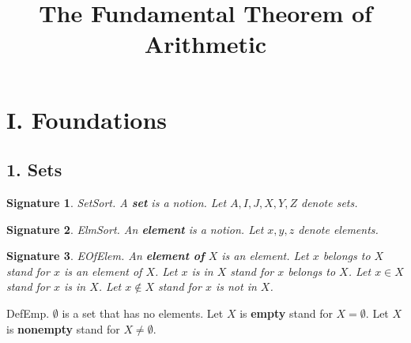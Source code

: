 \newtheorem{signature}{Signature}
\newtheorem{axiom}{Axiom}
\newtheorem{signaturep}{Signature}
\newtheorem{axiomp}{Axiom}
\newtheorem{definitionp}{Definition}
\newtheorem{theoremp}{Theorem}
\newtheorem{lemmap}{Lemma}
 
\newcommand{\power}{{\cal P}} 
\newcommand{\preimg}[2]{{#1}^{-1}[#2]} 
\newcommand{\Seq}[2]{\{#1,\dots,#2\}}
\newcommand{\Set}[3]{\{#1_{#2},\dots,#1_{#3}\}}
\newcommand{\Pro}[2]{\prod_{i\in #2}{#1}_i}
\newcommand{\Product}[3]{\prod_{i=#2}^{#3}{#1}_i}
\newcommand{\subfunc}[2]{{#1}_{#2}}
\newcommand{\CC}{{\Bbb C}}
\newcommand{\RR}{{\Bbb R}}
\newcommand{\QQ}{{\Bbb Q}}
\newcommand{\ZZ}{{\Bbb Z}} 
\newcommand{\NN}{{\Bbb N}}
\newcommand{\NNplus}{{\Bbb N}^+}

\title{The Fundamental Theorem of Arithmetic}
\maketitle
\section{I. Foundations}

\subsection{1. Sets}


\begin{signature} SetSort.  A {\bf set} is a notion.
Let $A,I,J,X,Y,Z$ denote sets.
\end{signature}

\begin{signature} ElmSort.  
An {\bf element} is a notion.
Let $x,y,z$ denote elements.
\end{signature}

\begin{signature} EOfElem.  
An {\bf element of} $X$ is an element.
Let $x$ belongs to $X$ stand for $x$ is an element of $X$.
Let $x$ is in $X$ stand for $x$ belongs to $X$.
Let $x \in X$ stand for $x$ is in $X$.
Let $x \notin X$ stand for $x$ is not in $X$.
\end{signature}

\begin{definition} DefEmp.
$\emptyset$ is a set that has no elements.
Let $X$ is {\bf empty} stand for $X = \emptyset$.
Let $X$ is {\bf nonempty} stand for $X \neq \emptyset$.
\end{definition}

